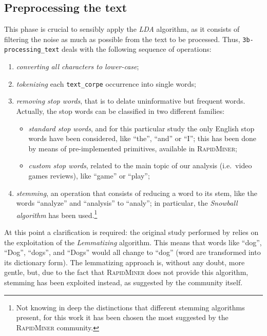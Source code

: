 \documentclass[a4paper]{article}
\begin{document}
	 	\subsection{Preprocessing the text}\label{subsec:processing-the-text}
	 		This phase is crucial to sensibly apply the \emph{LDA} algorithm, as it consists of filtering the noise as much as possible from the text to be processed. Thus, \verb*|3b-processing_text| deals with the following sequence of operations:
	 		\begin{enumerate}
	 			\item \emph{converting all characters to lower-case};
	 			\item \emph{tokenizing} each \verb*|text_corpe| occurrence into single words;
	 			\item \emph{removing stop words}, that is to delate uninformative but frequent words. Actually, the stop words can be classified in two different families:
	 			\begin{itemize}
	 				\item \emph{standard stop words}, and for this particular study the only English stop words have been considered, like ``the'', ``and'' or ``I''; this has been done by means of pre-implemented primitives, available in \textsc{RapidMiner};
	 				\item \emph{custom stop words}, related to the main topic of our analysis (i.e.~video games reviews), like ``game'' or ``play'';
	 			\end{itemize}
 				\item \emph{stemming}, an operation that consists of reducing a word to its stem, like the words ``analyze'' and ``analysis'' to ``analy''; in particular, the \emph{Snowball algorithm} has been used.\footnote{Not knowing in deep the distinctions that different stemming algorithms present, for this work it has been chosen the most suggested by the \textsc{RapidMiner} community.}
	 		\end{enumerate}
 			At this point a clarification is required: the original study performed by \citeauthor{article:muller} relies on the exploitation of the \emph{Lemmatizing} algorithm. This means that words like ``dog'', ``Dog'', ``dogs'', and ``Dogs'' would all change to ``dog'' (word are transformed into its dictionary form). The lemmatizing approach is, without any doubt, more gentle, but, due to the fact that \textsc{RapidMiner} does not provide this algorithm, stemming has been exploited instead, as suggested by the community itself. 
	 		
\end{document}

